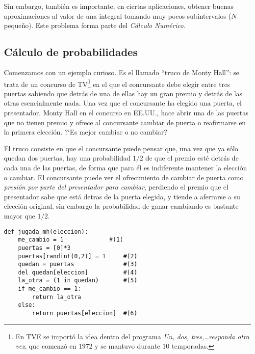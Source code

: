 Sin embargo, tambi\'en es importante,  en ciertas aplicaciones, obtener buenas 
aproximaciones al valor de una integral tomando muy pocos subintervalos ($N$
peque\~no). Este problema forma parte del {\itshape
C\'alculo Num\'erico}.


\subsection {C\'alculo de probabilidades}
 
 Comenzamos con un ejemplo curioso. Es el llamado ``truco de Monty Hall'': se
trata de un concurso  de TV\footnote{En TVE se import\'o la idea dentro del 
programa {\itshape 
Un, dos, tres,\dots  responda otra vez}, que comenz\'o en $1972$ y se mantuvo 
durante $10$ temporadas.}
en el que el concursante debe elegir entre tres
puertas sabiendo que detr\'as de una de ellas hay un gran premio y detr\'as de
las otras esencialmente nada. Una vez que el concursante ha elegido una puerta,
el presentador, Monty Hall en el concurso en EE.UU., hace abrir una de las
puertas que no tienen premio y ofrece al concursante cambiar de puerta o
reafirmarse en la primera elecci\'on. ?`Es mejor cambiar o no cambiar?

El truco consiste en que el concursante puede pensar que, una vez que ya s\'olo
quedan dos puertas,  hay una probabilidad $1/2$ de que el premio est\'e detr\'as
de cada una de las puertas, de forma que para \'el es indiferente mantener la
elecci\'on o cambiar. El concursante puede ver el ofrecimiento de cambiar de
puerta como {\itshape presi\'on por parte del presentador para cambiar}, 
perdiendo el
premio que el presentador sabe que est\'a detras de la puerta elegida,  y tiende
a aferrarse a su elecci\'on original, sin embargo la probabilidad de ganar
cambiando es bastante mayor que $1/2$.
\newpage
 \begin{lstlisting}
def jugada_mh(eleccion):
    me_cambio = 1    		  #(1)      
    puertas = [0]*3
    puertas[randint(0,2)] = 1     #(2)    
    quedan = puertas              #(3) 
    del quedan[eleccion]          #(4)
    la_otra = (1 in quedan)       #(5)
    if me_cambio == 1:
        return la_otra  
    else:
        return puertas[eleccion]  #(6) 
\end{lstlisting}

